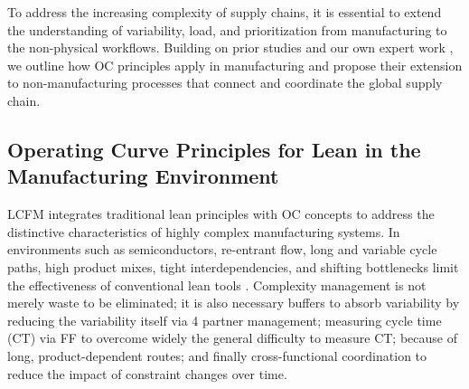 \documentclass[preprint,12pt,authoryear]{elsarticle}
\begin{document}
To address the increasing complexity of supply chains, it is essential to extend the understanding of variability, load, and prioritization from manufacturing to the non-physical workflows. Building on prior studies and our own expert work \citep{LauterEhmReiner2025}, we outline how OC principles apply in manufacturing and propose their extension to non-manufacturing processes that connect and coordinate the global supply chain.


    \subsection{Operating Curve Principles for Lean in the Manufacturing Environment}\label{subsec:Operating Curve Principles for Lean in the Manufacturing Environment}

LCFM \citep{bauer2011LCFM, wikipediaCFP} integrates traditional lean principles with OC concepts to address the distinctive characteristics of highly complex manufacturing systems. In environments such as semiconductors, re-entrant flow, long and variable cycle paths, high product mixes, tight interdependencies, and shifting bottlenecks limit the effectiveness of conventional lean tools \citep{azadegan2013effect, brukardt2024flow, huttmier2009trading}. Complexity management is not merely waste to be eliminated; it is also necessary buffers to absorb variability by reducing the variability itself via 4 partner management; measuring cycle time (CT) via FF to overcome widely the general difficulty to measure CT; because of long, product-dependent routes; and finally cross-functional coordination to reduce the impact of constraint changes over time.\par
\end{document}
